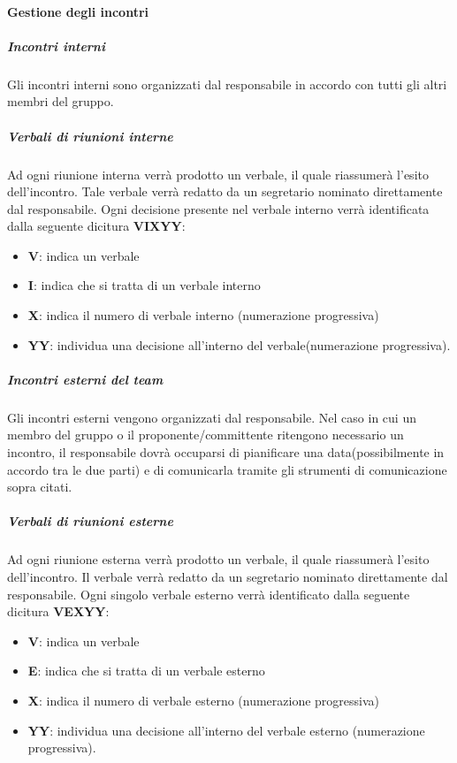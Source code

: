 			
			\paragraph{Gestione degli incontri}
			
				\subparagraph{Incontri interni}
				Gli incontri interni sono organizzati dal responsabile in accordo con tutti gli altri membri del gruppo. 
				
				\subparagraph{Verbali di riunioni interne}
				Ad ogni riunione interna verrà prodotto un verbale, il quale riassumerà l'esito dell'incontro. Tale verbale verrà redatto da un segretario nominato direttamente dal responsabile. Ogni decisione presente nel verbale interno verrà identificata dalla seguente dicitura \textbf{VIXYY}:
				\begin{itemize}
					\item \textbf{V}: indica un verbale
					\item\textbf{I}: indica che si tratta di un verbale interno
					\item\textbf{X}: indica il numero di verbale interno (numerazione progressiva)
					\item\textbf{YY}: individua una decisione all'interno del verbale(numerazione progressiva).
				\end{itemize}
			
				\subparagraph{Incontri esterni del team}
				Gli incontri esterni vengono organizzati dal responsabile. Nel caso in cui un membro del gruppo o il proponente/committente ritengono necessario un incontro, il responsabile dovrà occuparsi di pianificare una data(possibilmente in accordo tra le due parti) e di comunicarla tramite gli strumenti di comunicazione sopra citati.
				
				\subparagraph{Verbali di riunioni esterne}
				Ad ogni riunione esterna verrà prodotto un verbale, il quale riassumerà l'esito dell'incontro. Il verbale verrà redatto da un segretario nominato direttamente dal responsabile. Ogni singolo verbale esterno verrà identificato dalla seguente dicitura \textbf{VEXYY}:
				\begin{itemize}
					\item\textbf{V}: indica un verbale
					\item\textbf{E}: indica che si tratta di un verbale esterno
					\item\textbf{X}: indica il numero di verbale esterno (numerazione progressiva)
					\item\textbf{YY}: individua una decisione all'interno del verbale esterno (numerazione progressiva).
				\end{itemize}
			
